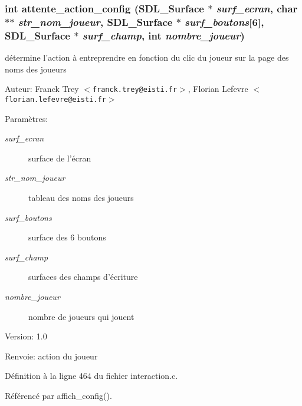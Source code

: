 \subsubsection{\setlength{\rightskip}{0pt plus 5cm}int attente\_\-action\_\-config (SDL\_\-Surface $\ast$ {\em surf\_\-ecran}, char $\ast$$\ast$ {\em str\_\-nom\_\-joueur}, SDL\_\-Surface $\ast$ {\em surf\_\-boutons}[6], SDL\_\-Surface $\ast$ {\em surf\_\-champ}, int {\em nombre\_\-joueur})}\label{interaction_8h_f196ea942cdf7af6071f82225d2d062c}


d\'{e}termine l'action \`{a} entreprendre en fonction du clic du joueur sur la page des noms des joueurs 

\begin{Desc}
\item[Auteur:]Franck Trey $<${\tt franck.trey@eisti.fr}$>$, Florian Lefevre $<${\tt florian.lefevre@eisti.fr}$>$\end{Desc}
\begin{Desc}
\item[Param\`{e}tres:]
\begin{description}
\item[{\em surf\_\-ecran}]surface de l'\'{e}cran \item[{\em str\_\-nom\_\-joueur}]tableau des noms des joueurs \item[{\em surf\_\-boutons}]surface des 6 boutons \item[{\em surf\_\-champ}]surfaces des champs d'\'{e}criture \item[{\em nombre\_\-joueur}]nombre de joueurs qui jouent\end{description}
\end{Desc}
\begin{Desc}
\item[Version:]1.0 \end{Desc}
\begin{Desc}
\item[Renvoie:]action du joueur \end{Desc}


D\'{e}finition \`{a} la ligne 464 du fichier interaction.c.

R\'{e}f\'{e}renc\'{e} par affich\_\-config().

